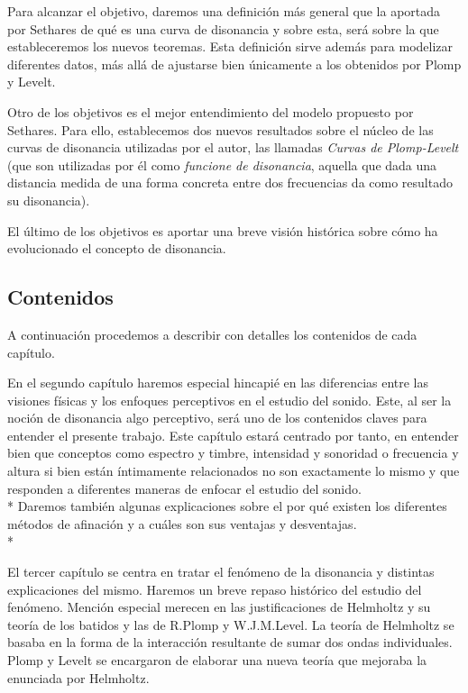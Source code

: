 \documentclass[11pt,a4paper]{article}
\begin{document}
Para alcanzar el objetivo, daremos una definición más general que la aportada por Sethares de qué es una curva de disonancia y sobre esta, será sobre la que estableceremos los nuevos teoremas. Esta definición sirve además para modelizar diferentes datos, más allá de ajustarse bien únicamente a los obtenidos por Plomp y Levelt.

Otro de los objetivos es el mejor entendimiento del modelo propuesto por Sethares. Para ello, establecemos dos nuevos resultados sobre el núcleo de las curvas de disonancia utilizadas por el autor, las llamadas \emph{Curvas de Plomp-Levelt} (que son utilizadas por él como \emph{funcione de disonancia}, aquella que dada una distancia medida de una forma concreta entre dos frecuencias da como resultado su disonancia).

El último de los objetivos es aportar una breve visión histórica sobre cómo ha evolucionado el concepto de disonancia.

\subsection{Contenidos}

A continuación procedemos a describir con detalles los contenidos de cada capítulo.

En el segundo capítulo haremos especial hincapié en las diferencias entre las visiones físicas y los enfoques perceptivos en el estudio del sonido. Este, al ser la noción de disonancia algo perceptivo, será uno de los contenidos claves para entender el presente trabajo. Este capítulo estará centrado por tanto, en entender bien que conceptos como espectro y timbre, intensidad y sonoridad o frecuencia y altura si bien están íntimamente relacionados no son exactamente lo mismo y que responden a diferentes maneras de enfocar el estudio del sonido.\\*
Daremos también algunas explicaciones sobre el por qué existen los diferentes métodos de afinación y a cuáles son sus ventajas y desventajas.
\\*

El tercer capítulo se centra en tratar el fenómeno de la disonancia y distintas explicaciones del mismo. Haremos un breve repaso histórico del estudio del fenómeno. Mención especial merecen en las justificaciones de Helmholtz y su teoría de los batidos y las de R.Plomp y W.J.M.Level. La teoría de Helmholtz se basaba en la forma de la interacción resultante de sumar dos ondas individuales. Plomp y Levelt se encargaron de elaborar una nueva teoría que mejoraba la enunciada por Helmholtz.
\end{document}
